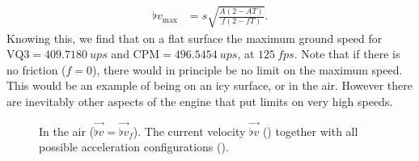 \begin{align}
\label{eq:flat_v_max}
\flat{v}_{\max} &= s \sqrt{\frac{A (2 - AT)}{f (2 - fT)}}.
\end{align}
Knowing this, we find that on a flat surface the maximum ground speed for $\text{VQ3} = \qty{409.7180}{ups}$ and $\text{CPM} = \qty{496.5454}{ups}$, at $\qty{125}{fps}$. Note that if there is no friction ($f = 0$), there would in principle be no limit on the maximum speed. This would be an example of being on an icy surface, or in the air. However there are inevitably other aspects of the engine that put limits on very high speeds.


\begin{figure}[H]
	\centering
	\begin{subfigure}[t]{.5\textwidth}
		\centering
		\setlength\figureheight{5.5cm}
		\setlength\figurewidth{5.5cm}
		\caption{}
		\label{fig:delta_min_air}
	\end{subfigure}%
	\begin{subfigure}[t]{.5\textwidth}
		\centering
		\setlength\figureheight{5.5cm}
		\setlength\figurewidth{5.5cm}
		\caption{}
		\label{fig:delta_air}
	\end{subfigure}
	\begin{subfigure}[t]{.5\textwidth}
		\centering
		\setlength\figureheight{5.5cm}
		\setlength\figurewidth{5.5cm}
		\caption{}
		\label{fig:delta_opt_air}
	\end{subfigure}%
	\begin{subfigure}[t]{.5\textwidth}
		\centering
		\setlength\figureheight{5.5cm}
		\setlength\figurewidth{5.5cm}
		\caption{}
		\label{fig:delta_max_air}
	\end{subfigure}
	\caption{In the air ($\vec{\flat{v}} = \vec{\flat{v}}_f$). The current velocity $\vec{\flat{v}}$ (\yellowarrow) together with all possible acceleration configurations (\lightorangearea).}
\end{figure}

